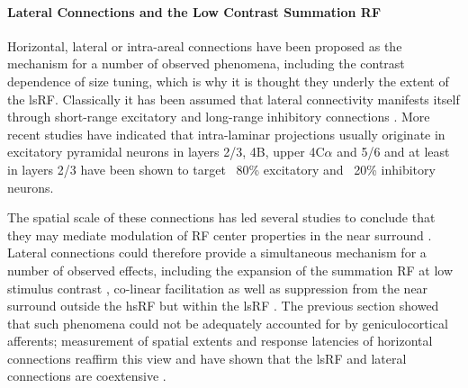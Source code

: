 \paragraph{Lateral Connections and the Low Contrast Summation RF}

Horizontal, lateral or intra-areal connections have been proposed as
the mechanism for a number of observed phenomena, including the
contrast dependence of size tuning, which is why it is thought they
underly the extent of the lsRF. Classically it has been assumed that
lateral connectivity manifests itself through short-range excitatory
and long-range inhibitory connections
\citep{VonderMalsburg1973,Obermayer1990b}. More recent studies have
indicated that intra-laminar projections usually originate in
excitatory pyramidal neurons in layers 2/3, 4B, upper 4C$\alpha$ and
5/6 and at least in layers 2/3 have been shown to target ~80\%
excitatory and ~20\% inhibitory neurons. %

The spatial scale of these connections has led several studies to
conclude that they may mediate modulation of RF center properties in
the near surround \citep{Angelucci2002}. Lateral connections could
therefore provide a simultaneous mechanism for a number of observed
effects, including the expansion of the summation RF at low stimulus
contrast \citep{Sceniak1999}, co-linear facilitation
\citep{Mizobe2001} as well as suppression from the near surround
outside the hsRF but within the lsRF
\citep{Sceniak2001,Levitt2002}. The previous section showed that such
phenomena could not be adequately accounted for by geniculocortical
afferents; measurement of spatial extents and response latencies of
horizontal connections reaffirm this view and have shown that the lsRF
and lateral connections are coextensive \citep{Angelucci2002}.

